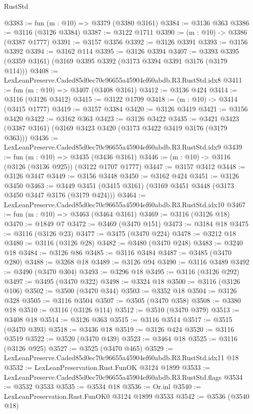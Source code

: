 \begin{lexlean}{RustStd}
\begin{coremodule}
@3383 := fun (m : @10) => @3379 (@3380 @3161)
@3384 := @3136 @363
@3386 := @3116 (@3126 @3384)
@3387 := @3122 @1711
@3390 := (m : @10) -> @3386 (@3387 @1777)
@3391 := @3157 @3356
@3392 := @3126 @3391
@3393 := @3156 @3392
@3394 := @3162 @114
@3395 := @3126 @3394
@3407 := @3393 @3395 (@3359 @3161) (@3169 @3395 @3392 (@3173 @3394 @3391 @3176 (@3179 @114)))
@3408 := LexLeanPreserve.Caded85d0ec70c96655a45904ef60abdb.R3.RustStd.idx8
@3411 := fun (m : @10) => @3407 (@3408 @3161)
@3412 := @3136 @424
@3414 := @3116 (@3126 @3412)
@3415 := @3122 @1709
@3418 := (m : @10) -> @3414 (@3415 @1777)
@3419 := @3157 @3384
@3420 := @3126 @3419
@3421 := @3156 @3420
@3422 := @3162 @363
@3423 := @3126 @3422
@3435 := @3421 @3423 (@3387 @3161) (@3169 @3423 @3420 (@3173 @3422 @3419 @3176 (@3179 @363)))
@3436 := LexLeanPreserve.Caded85d0ec70c96655a45904ef60abdb.R3.RustStd.idx9
@3439 := fun (m : @10) => @3435 (@3436 @3161)
@3446 := (m : @10) -> @3116 (@3126 (@3136 @925)) (@3122 @1707 @1777)
@3447 := @3157 @3412
@3448 := @3126 @3447
@3449 := @3156 @3448
@3450 := @3162 @424
@3451 := @3126 @3450
@3463 := @3449 @3451 (@3415 @3161) (@3169 @3451 @3448 (@3173 @3450 @3447 @3176 (@3179 @424)))
@3464 := LexLeanPreserve.Caded85d0ec70c96655a45904ef60abdb.R3.RustStd.idx10
@3467 := fun (m : @10) => @3463 (@3464 @3161)
@3469 := @3116 (@3126 @18)
@3470 := @1849 @7
@3472 := @3469 (@3470 @151)
@3473 := @3184 @18
@3475 := @3116 (@3126 @23)
@3477 := @3475 (@3470 @224)
@3478 := @3212 @18
@3480 := @3116 (@3126 @28)
@3482 := @3480 (@3470 @248)
@3483 := @3240 @18
@3484 := @3126 @86
@3485 := @3116 @3484
@3487 := @3485 (@3470 @280)
@3488 := @3268 @18
@3489 := @3126 @94
@3490 := @3116 @3489
@3492 := @3490 (@3470 @304)
@3493 := @3296 @18
@3495 := @3116 (@3126 @292)
@3497 := @3495 (@3470 @322)
@3498 := @3324 @18
@3500 := @3116 (@3126 @106)
@3502 := @3500 (@3470 @344)
@3503 := @3352 @18
@3504 := @3126 @328
@3505 := @3116 @3504
@3507 := @3505 (@3470 @358)
@3508 := @3380 @18
@3510 := @3116 (@3126 @114)
@3512 := @3510 (@3470 @379)
@3513 := @3408 @18
@3514 := @3126 @363
@3515 := @3116 @3514
@3517 := @3515 (@3470 @393)
@3518 := @3436 @18
@3519 := @3126 @424
@3520 := @3116 @3519
@3522 := @3520 (@3470 @439)
@3523 := @3464 @18
@3525 := @3116 (@3126 @925)
@3527 := @3525 (@3470 @465)
@3529 := LexLeanPreserve.Caded85d0ec70c96655a45904ef60abdb.R3.RustStd.idx11 @18
@3532 := LexLeanPreservation.Rust.FunOK @3124 @1899
@3533 := LexLeanPreserve.Caded85d0ec70c96655a45904ef60abdb.R3.RustStd.flags
@3534 := @3532 @3533
@3535 := @3534 @18
@3536 := Or.inl
@3540 := LexLeanPreservation.Rust.FunOK0 @3124 @1899 @3533
@3542 := @3536 (@3540 @18)

\end{coremodule}
\end{lexlean}
